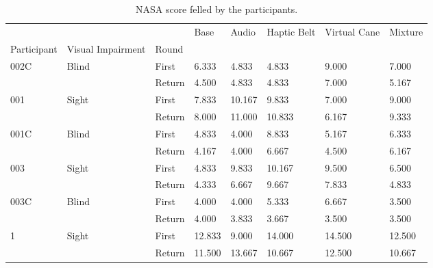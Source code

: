 
\begin{table}[!htb]
\centering
\caption{NASA score felled by the participants.}
\label{tab:nasa_table}
\begin{tabular}{llllllll}
\toprule
  &       &        &   Base &  Audio & Haptic Belt & Virtual Cane & Mixture \\
Participant & Visual Impairment & Round &        &        &             &              &         \\
\midrule
002C & Blind & First &  6.333 &  4.833 &       4.833 &        9.000 &   7.000 \\
  &       & Return &  4.500 &  4.833 &       4.833 &        7.000 &   5.167 \\
001 & Sight & First &  7.833 & 10.167 &       9.833 &        7.000 &   9.000 \\
  &       & Return &  8.000 & 11.000 &      10.833 &        6.167 &   9.333 \\
001C & Blind & First &  4.833 &  4.000 &       8.833 &        5.167 &   6.333 \\
  &       & Return &  4.167 &  4.000 &       6.667 &        4.500 &   6.167 \\
003 & Sight & First &  4.833 &  9.833 &      10.167 &        9.500 &   6.500 \\
  &       & Return &  4.333 &  6.667 &       9.667 &        7.833 &   4.833 \\
003C & Blind & First &  4.000 &  4.000 &       5.333 &        6.667 &   3.500 \\
  &       & Return &  4.000 &  3.833 &       3.667 &        3.500 &   3.500 \\
1 & Sight & First & 12.833 &  9.000 &      14.000 &       14.500 &  12.500 \\
  &       & Return & 11.500 & 13.667 &      10.667 &       12.500 &  10.667 \\
\bottomrule
\end{tabular}
\end{table}

